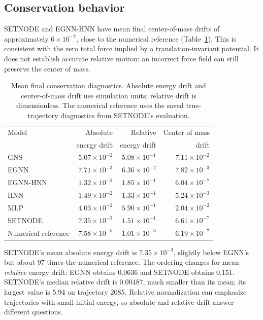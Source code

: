 \documentclass[10pt,letterpaper,twocolumn]{article}
\numberwithin{equation}{section}
\begin{document}
\subsection{Conservation behavior}

SETNODE and EGNN-HNN have mean final center-of-mass drifts of approximately $6\times10^{-7}$,
close to the numerical reference (Table~\ref{tab:conservation}). This is consistent with the zero
total force implied by a translation-invariant potential. It does not establish accurate relative
motion: an incorrect force field can still preserve the center of mass.

\begin{table}[t]
\centering\fontsize{8.6}{10}\selectfont
\caption{Mean final conservation diagnostics. Absolute energy drift and center-of-mass drift use
simulation units; relative drift is dimensionless. The numerical reference uses the saved
true-trajectory diagnostics from SETNODE's evaluation.}
\label{tab:conservation}
\setlength{\tabcolsep}{3.2pt}
\begin{tabular}{lrrr}
\toprule
Model & Absolute & Relative & Center of mass\\
 & energy drift & energy drift & drift\\
\midrule
GNS & $5.07\times 10^{-2}$ & $5.08\times 10^{-1}$ & $7.11\times 10^{-2}$ \\
EGNN & $7.71\times 10^{-3}$ & $6.36\times 10^{-2}$ & $7.82\times 10^{-3}$ \\
EGNN-HNN & $1.32\times 10^{-2}$ & $1.85\times 10^{-1}$ & $6.04\times 10^{-7}$ \\
HNN & $1.49\times 10^{-2}$ & $1.33\times 10^{-1}$ & $5.24\times 10^{-3}$ \\
MLP & $4.03\times 10^{-2}$ & $5.90\times 10^{-1}$ & $2.04\times 10^{-2}$ \\
SETNODE & $7.35\times 10^{-3}$ & $1.51\times 10^{-1}$ & $6.61\times 10^{-7}$ \\
\midrule
Numerical reference & $7.58\times 10^{-5}$ & $1.01\times 10^{-3}$ & $6.19\times 10^{-7}$ \\
\bottomrule
\end{tabular}
\end{table}

SETNODE's mean absolute energy drift is $7.35\times10^{-3}$, slightly below EGNN's but about
97 times the numerical reference. The ordering changes for mean \emph{relative} energy drift:
EGNN obtains 0.0636 and SETNODE obtains 0.151. SETNODE's median relative drift is 0.00487, much
smaller than its mean; its largest value is 5.94 on trajectory 2085. Relative normalization can
emphasize trajectories with small initial energy, so absolute and relative drift answer different
questions.
\end{document}
